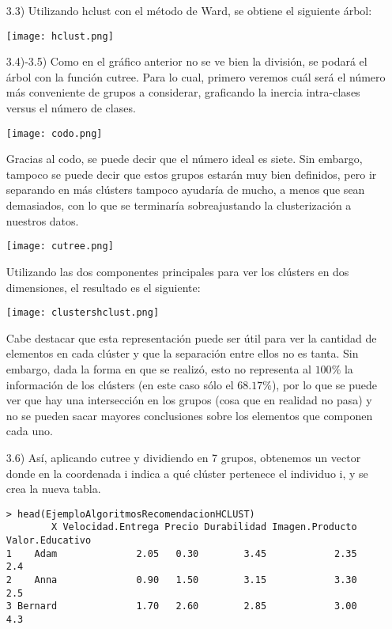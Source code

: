\documentclass[11pt,a4paper]{report}
\begin{document}
\begin{itemize}
\begin{itemize}
\item[3.3)] Utilizando hclust con el método de Ward, se obtiene el siguiente árbol:
\begin{center}
\texttt{[image: hclust.png]}
\end{center}
\item[3.4)-3.5)] Como en el gráfico anterior no se ve bien la división, se podará el árbol con la función cutree. Para lo cual, primero veremos cuál será el número más conveniente de grupos a considerar, graficando la inercia intra-clases versus el número de clases.
\begin{center}
\texttt{[image: codo.png]}
\end{center}
Gracias al codo, se puede decir que el número ideal es siete. Sin embargo, tampoco se puede decir que estos grupos estarán muy bien definidos, pero ir separando en más clústers tampoco ayudaría de mucho, a menos que sean demasiados, con lo que se terminaría sobreajustando la clusterización a nuestros datos.\\
\begin{center}
\texttt{[image: cutree.png]}
\end{center}
Utilizando las dos componentes principales para ver los clústers en dos dimensiones, el resultado es el siguiente:
\begin{center}
\texttt{[image: clustershclust.png]}
\end{center}
Cabe destacar que esta representación puede ser útil para ver la cantidad de elementos en cada clúster y que la separación entre ellos no es tanta. Sin embargo, dada la forma en que se realizó, esto no representa al $100\%$ la información de los clústers (en este caso sólo el $68.17\%$), por lo que se puede ver que hay una intersección en los grupos (cosa que en realidad no pasa) y no se pueden sacar mayores conclusiones sobre los elementos que componen cada uno.\\
\item[3.6)] Así, aplicando cutree y dividiendo en 7 grupos, obtenemos un vector donde en la coordenada i indica a qué clúster pertenece el individuo i, y se crea la nueva tabla.
\begin{verbatim}
> head(EjemploAlgoritmosRecomendacionHCLUST)
        X Velocidad.Entrega Precio Durabilidad Imagen.Producto Valor.Educativo
1    Adam              2.05   0.30        3.45            2.35             2.4
2    Anna              0.90   1.50        3.15            3.30             2.5
3 Bernard              1.70   2.60        2.85            3.00             4.3

\end{verbatim}
\end{itemize}
\end{itemize}
\end{document}
